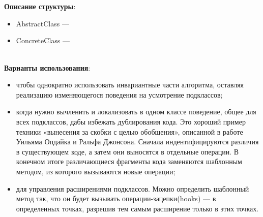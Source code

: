 \documentclass[a3paper,11pt]{report}
\def \boxSize {7cm}
\def \sboxSize {5cm}
\newcommand{\umlnoteND}[6]{
	\node[umlcd style, anchor=north, draw, shape=umlcdnote, text width=#2] at (#1) (note) {#3};
	\draw [umlcd style dashed line , ] (note.#4) ++(#5) --++(#6) coordinate(tmp) node[circle,inner sep=0pt,draw, fill=black!1, minimum size=5pt] (NoD) { };
}
\begin{document}
\\\\
\textbf{Описание структуры}:
\begin{itemize}
\item AbstractClass ---
\item ConcreteClass ---
\end{itemize}

\large\textbf{\\Варианты использования}:
\begin{itemize}
\item чтобы однократно использовать инвариантные части алгоритма, оставляя реализацию изменяющегося поведения на усмотрение подклассов;
\item когда нужно вычленить и локализовать в одном классе поведение, общее для всех подклассов, дабы избежать дублирования кода. Это хороший пример техники «вынесения за скобки с целью обобщения», описанной в работе Уильяма Опдайка и Ральфа Джонсона. Сначала индентифицируются различия в существующем коде, а затем они выносятся в отдельные операции. В конечном итоге различающиеся фрагменты кода заменяются шаблонным методом, из которого вызываются новые операции;
\item для управления расширениями подклассов. Можно определить шаблонный метод так, что он будет вызывать операции-зацепки(hooks) --- в определенных точках, разрешив тем самым расширение только в этих точках.
\end{itemize}
\end{document}
